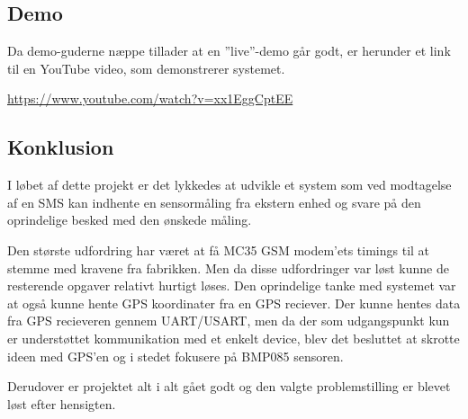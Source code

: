 \subsection{Demo}
Da demo-guderne næppe tillader at en ''live''-demo går godt, er herunder et link til en YouTube video, som demonstrerer systemet.

\vskip 0.5cm
	\begin{center}
		\url{https://www.youtube.com/watch?v=xx1EggCptEE}
	\end{center}
\vskip 0.5cm

\subsection{Konklusion}

I løbet af dette projekt er det lykkedes at udvikle et system som ved modtagelse af en SMS kan indhente en sensormåling fra ekstern enhed og svare på den oprindelige besked med den ønskede måling. 

Den største udfordring har været at få MC35 GSM modem'ets timings til at stemme med kravene fra fabrikken. Men da disse udfordringer var løst kunne de resterende opgaver relativt hurtigt løses.
Den oprindelige tanke med systemet var at også kunne hente GPS koordinater fra en GPS reciever. Der kunne hentes data fra GPS recieveren gennem UART/USART, men da der som udgangspunkt kun 
er understøttet kommunikation med et enkelt device, blev det besluttet at skrotte ideen med GPS'en og i stedet fokusere på BMP085 sensoren.

Derudover er projektet alt i alt gået godt og den valgte problemstilling er blevet løst efter hensigten. 